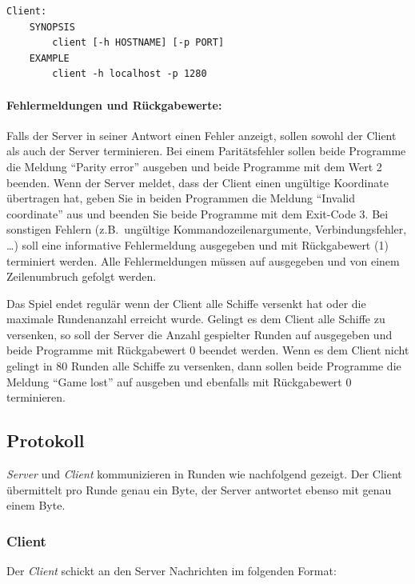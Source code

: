 \begin{verbatim}
Client:
    SYNOPSIS
        client [-h HOSTNAME] [-p PORT]
    EXAMPLE
        client -h localhost -p 1280
\end{verbatim}

\paragraph{Fehlermeldungen und Rückgabewerte:}

Falls der Server in seiner Antwort einen Fehler anzeigt, sollen sowohl der Client als auch der Server terminieren.
Bei einem Paritätsfehler sollen beide Programme die Meldung ``Parity error'' ausgeben
und beide Programme mit dem Wert 2 beenden.
Wenn der Server meldet, dass der Client einen ungültige Koordinate übertragen hat,
geben Sie in beiden Programmen die Meldung ``Invalid coordinate'' aus und beenden Sie beide Programme mit dem Exit-Code 3.
Bei sonstigen Fehlern (z.B.\ ungültige Kommandozeilenargumente, Verbindungsfehler, \ldots)
soll eine informative Fehlermeldung ausgegeben und mit Rückgabewert
 (1) terminiert werden. Alle Fehlermeldungen müssen auf
 ausgegeben und von einem Zeilenumbruch gefolgt werden.

Das Spiel endet regulär wenn der Client alle Schiffe versenkt hat oder die maximale Rundenanzahl erreicht wurde.
Gelingt es dem Client alle Schiffe zu versenken, so soll der Server die Anzahl gespielter Runden auf  ausgegeben und beide
Programme mit Rückgabewert 0 beendet werden.
Wenn es dem Client nicht gelingt in 80 Runden alle Schiffe zu versenken, dann sollen beide Programme die Meldung ``Game lost'' auf  ausgeben
und ebenfalls mit Rückgabewert 0 terminieren.

\subsection*{Protokoll}
\label{sec:prot}
\emph{Server} und \emph{Client} kommunizieren in Runden wie nachfolgend
gezeigt. Der Client übermittelt pro Runde genau ein Byte,
der Server antwortet ebenso mit genau einem Byte.

\subsubsection*{Client}
Der \emph{Client} schickt an den Server Nachrichten im folgenden Format:

